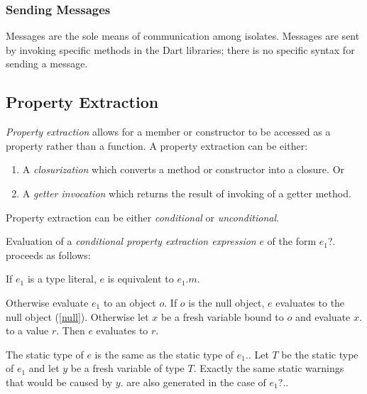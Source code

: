 \documentclass{article}
\newcommand{\code}[1]{{\sf #1}}
\begin{document}
\subsubsection{Sending Messages}

\LMHash{}
Messages are the sole means of communication among isolates. Messages are sent by invoking specific  methods in the Dart libraries; there is no specific syntax for sending a message.




\subsection{ Property Extraction}

\LMHash{}
{\em Property extraction} allows for a member or constructor to be accessed as a property rather than a function.
A property extraction can be either:
\begin{enumerate}
\item A {\em closurization} which converts a method or constructor into a closure. Or
\item A {\em getter invocation} which returns the result of invoking of a getter method.
\end{enumerate}



Property extraction can be either {\em conditional} or {\em unconditional}.

\LMHash{}
Evaluation of a {\em conditional property extraction expression} $e$
of the form \code{$e_1$?.} proceeds as follows:

\LMHash{}
If $e_1$ is a type literal, $e$ is equivalent to \code{$e_1$.$m$}.

\LMHash{}
Otherwise evaluate $e_1$ to an object $o$.
If $o$ is the null object, $e$ evaluates to the null object (\ref{null}).
Otherwise let $x$ be a fresh variable bound to $o$
and evaluate \code{$x$.} to a value $r$.
Then $e$ evaluates to $r$.


The static type of $e$ is the same as the static type of \code{$e_1$.}. Let $T$ be the static type of $e_1$ and let $y$ be a fresh variable of type $T$. Exactly the same static warnings that would be caused by \code{$y$.} are also generated in the case of \code{$e_1$?.}.
\end{document}
